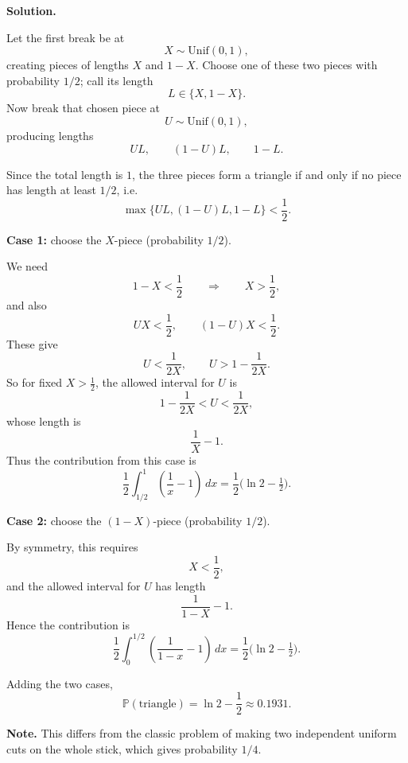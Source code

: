 \documentclass[11pt,letterpaper,openany]{book}
\begin{document}
\textbf{Solution.}

Let the first break be at
\[
X \sim \mathrm{Unif}(0,1),
\]
creating pieces of lengths \(X\) and \(1-X\). Choose one of these two pieces with probability \(1/2\); call its length
\[
L \in \{X,1-X\}.
\]
Now break that chosen piece at
\[
U \sim \mathrm{Unif}(0,1),
\]
producing lengths
\[
UL,\qquad (1-U)L,\qquad 1-L.
\]

Since the total length is \(1\), the three pieces form a triangle if and only if no piece has length at least \(1/2\), i.e.
\[
\max\{UL,(1-U)L,1-L\}<\frac12.
\]

\textbf{Case 1:} choose the \(X\)-piece (probability \(1/2\)).

We need
\[
1-X<\frac12 \qquad\Longrightarrow\qquad X>\frac12,
\]
and also
\[
UX<\frac12,\qquad (1-U)X<\frac12.
\]
These give
\[
U<\frac{1}{2X},
\qquad
U>1-\frac{1}{2X}.
\]
So for fixed \(X>\tfrac12\), the allowed interval for \(U\) is
\[
1-\frac{1}{2X}<U<\frac{1}{2X},
\]
whose length is
\[
\frac{1}{X}-1.
\]
Thus the contribution from this case is
\[
\frac12 \int_{1/2}^1 \left(\frac{1}{x}-1\right)\,dx
=
\frac12\bigl(\ln 2-\tfrac12\bigr).
\]

\textbf{Case 2:} choose the \((1-X)\)-piece (probability \(1/2\)).

By symmetry, this requires
\[
X<\frac12,
\]
and the allowed interval for \(U\) has length
\[
\frac{1}{1-X}-1.
\]
Hence the contribution is
\[
\frac12 \int_0^{1/2} \left(\frac{1}{1-x}-1\right)\,dx
=
\frac12\bigl(\ln 2-\tfrac12\bigr).
\]

Adding the two cases,
\[
\mathbb{P}(\text{triangle})
=
\ln 2-\frac12
\approx 0.1931.
\]

\textbf{Note.} This differs from the classic problem of making two independent uniform cuts on the whole stick, which gives probability \(1/4\).
\end{document}
